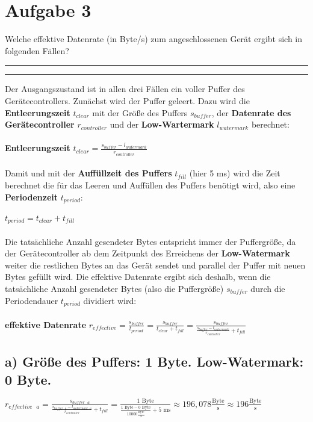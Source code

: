 \documentclass{ti2}
\makeatletter
\renewenvironment{quote}{%
	\vskip 10\p@
	\parindent\z@
	\tcolorbox[
	breakable, sharp corners,
	boxrule=\z@, boxsep=\z@,
	left=\z@, right=\z@,
	top=\z@, bottom=\z@,
	colback=sx-yellow
	]
	{\color{sx-orange}\d@ublerule}
	\vskip 5\p@
	\list{}{\rightmargin\leftmargin}%
	\item\relax
}{%
\endlist
{\color{sx-orange}\d@ublerule}
\endtcolorbox
\vskip 5\p@
}
\def\d@ublerule{\hrule\@width\hsize\kern 1.5\p@\hrule\@width\hsize}
\makeatother
\begin{document}
\section*{Aufgabe 3}
	\begin{quote}
		Welche effektive Datenrate (in Byte/s) zum angeschlossenen Gerät ergibt sich in folgenden Fällen?
	\end{quote}
	Der Ausgangszustand ist in allen drei Fällen ein voller Puffer des Gerätecontrollers. Zunächst wird der Puffer geleert. Dazu wird die \textbf{Entleerungszeit} $t_{clear}$ mit der Größe des Puffers $s_{buffer}$, der \textbf{Datenrate des Gerätecontroller} $r_{controller}$ und der \textbf{Low-Wartermark} $l_{watermark}$ berechnet:\\ \\
	\textbf{Entleerungszeit} $t_{clear} = \frac{s_{buffer} - l_{watermark}}{r_{controller}}$\\ \\
	Damit und mit der \textbf{Auffüllzeit des Puffers} $t_{fill}$ (hier 5 ms) wird die Zeit berechnet die für das Leeren und Auffüllen des Puffers benötigt wird, also eine \textbf{Periodenzeit} $t_{period}$:\\ \\
	$t_{period} = t_{clear} + t_{fill}$\\ \\
	Die tatsächliche Anzahl gesendeter Bytes entspricht immer der Puffergröße, da der Gerätecontroller ab dem Zeitpunkt des Erreichens der \textbf{Low-Watermark} weiter die restlichen Bytes an das Gerät sendet und parallel der Puffer mit neuen Bytes gefüllt wird. Die effektive Datenrate ergibt sich deshalb, wenn die tatsächliche Anzahl gesendeter Bytes (also die Puffergröße) $s_{buffer}$ durch die Periodendauer $t_{period}$ dividiert wird:\\ \\
	\textbf{effektive Datenrate} $r_{effective} = \frac{s_{buffer}}{t_{period}} = \frac{s_{buffer}}{t_{clear} + t_{fill}} = \frac{s_{buffer}}{\frac{s_{buffer} - l_{watermark}}{r_{controller}} + t_{fill}}$
	\subsection*{a) Größe des Puffers: 1 Byte. Low-Watermark: 0 Byte.}
		$r_{effective \text{ } a} = \frac{s_{buffer \text{ } a}}{\frac{s_{buffer \text{ } a} - l_{watermark \text{ } a}}{r_{controller}} + t_{fill}} = \frac{1 \text{ Byte}}{\frac{1 \text{ Byte} - 0 \text{ Byte}}{10000 \frac{ \text{Byte}}{\text{s}}} + 5 \text{ ms}} \approx 196,078 \frac{ \text{Byte}}{\text{s}} \approx 196 \frac{\text{Byte}}{\text{s}}$
\end{document}
